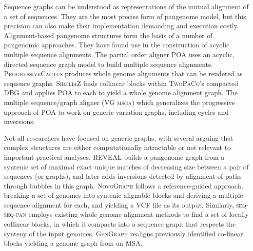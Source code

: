 Sequence graphs \cite{hein1989new} can be understood as representations of the mutual alignment of a set of sequences.
They are the most precise form of pangenome model, but this precision can also make their implementation demanding and execution costly.
Alignment-based pangenome structures form the basis of a number of pangenomic approaches.
They have found use in the construction of acyclic multiple sequence alignments.
The partial order aligner \textsc{POA} \cite{Lee_2002,Grasso_2004} uses an acyclic, directed sequence graph model to build multiple sequence alignments.
\textsc{ProgressiveCactus} \cite{Armstrong_2019} produces whole genome alignments that can be rendered as sequence graphs.
\textsc{SibeliaZ} \cite{Minkin_2019} finds collinear blocks within \textsc{TwoPaCo}'s compacted DBG and applies \textsc{POA} to each to yield a whole genome alignment graph.
The multiple sequence/graph aligner (\textsc{VG msga}) \cite{Novak_2017a,Garrison_2018,Garrison_2019} which generalizes the progressive approach of \textsc{POA} to work on generic variation graphs, including cycles and inversions.

Not all researchers have focused on generic graphs, with several arguing that complex structures are either computationally intractable or not relevant to important practical analyses.
\textsc{REVEAL} \cite{linthorst2015scalable} builds a pangenome graph from a syntenic set of maximal exact unique matches of decreasing size between a pair of sequences (or graphs), and later adds inversions detected by alignment of paths through bubbles in this graph.
\textsc{NovoGraph} \cite{Biederstedt2018} follows a reference-guided approach, breaking a set of genomes into syntenic alignable blocks and deriving a multiple sequence alignment for each, and yielding a VCF file as its output.
Similarly, \textsc{seq-seq-pan} \cite{Jandrasits_2018} employs existing whole genome alignment methods to find a set of locally collinear blocks, in which it compacts into a sequence graph that respects the synteny of the input genomes.
\textsc{GenGraph} \cite{Ambler_2019} realigns previously identified co-linear blocks yielding a genome graph from an MSA.


